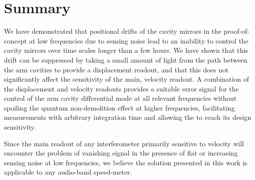 \section{\label{sec:summary}Summary}

We have demonstrated that positional drifts of the cavity mirrors in the proof-of-concept \SSM{} at low frequencies due to sensing noise lead to an inability to control the cavity mirrors over time scales longer than a few hours. We have shown that this drift can be suppressed by taking a small amount of light from the path between the arm cavities to provide a displacement readout, and that this does not significantly affect the sensitivity of the main, velocity readout. A combination of the displacement and velocity readouts provides a suitable error signal for the control of the arm cavity differential mode at all relevant frequencies without spoiling the quantum non-demolition effect at higher frequencies, facilitating measurements with arbitrary integration time and allowing the \SSM{} to reach its design sensitivity.

Since the main readout of any interferometer primarily sensitive to velocity will encounter the problem of vanishing signal in the presence of flat or increasing sensing noise at low frequencies, we believe the solution presented in this work is applicable to any audio-band speed-meter.